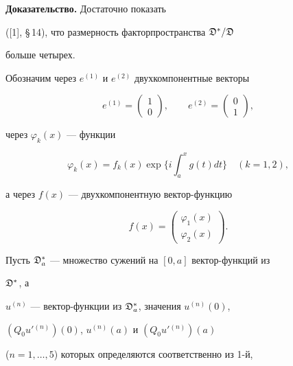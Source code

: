  


{\bf Доказательство.} Достаточно показать 


([1], \S\,14), что размерность факторпространства $\frak D^*/\frak D$ 


больше четырех. 


 


Обозначим через $e^{(1)}$ и $e^{(2)}$ двухкомпонентные векторы 


$$ 


e^{(1)}=\begin{pmatrix}1 \\ 0 \end{pmatrix} 


,\qquad 


e^{(2)}=\begin{pmatrix} 0 \\ 1 \end{pmatrix} 


, 


$$ 


через $\varphi_k(x)$ --- функции 


\begin{equation} 


\varphi_k(x)=f_k(x)\exp\bigg\{i\int^x_a g(t)dt\bigg\}\quad 


(k=1,2), 


\end{equation} 


а через $f(x)$ --- двухкомпонентную вектор-функцию 


\begin{equation} 


f(x)=\begin{pmatrix} 


\varphi_1(x) \\ \varphi_2(x) 


\end{pmatrix} 


. 


\end{equation} 


Пусть $\frak D^*_a$ --- множество сужений на $[0,a]$ вектор-функций из 


$\frak D^*$, а 


$u^{(n)}$ --- вектор-функции из $\frak D^*_a$, значения $u^{(n)}(0)$, 


$(Q_0u'{}^{(n)})(0)$, $u^{(n)}(a)$ и $(Q_0u'{}^{(n)})(a)$ 


($n=1,\dotsc,5$) которых определяются соответственно из 1-й, 



